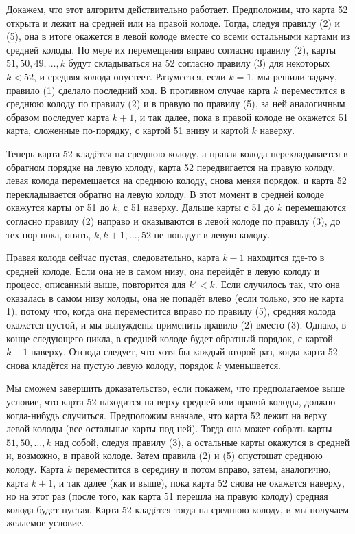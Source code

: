 Докажем, что этот алгоритм действительно работает.
Предположим, что карта 52 открыта и лежит на средней или на правой колоде.
Тогда, следуя правилу (2) и (5), она в итоге окажется в левой колоде вместе со всеми остальными картами из средней колоды.
По мере их перемещения вправо согласно правилу (2), карты $51, 50, 49, \dots, k$ будут складываться на 52 согласно правилу (3) для некоторых $k < 52$, и средняя колода опустеет.
Разумеется, если $k = 1$, мы решили задачу, правило (1) сделало последний ход.
В противном случае карта $k$ переместится в среднюю колоду по правилу (2) и в правую по правилу (5), за ней аналогичным образом последует карта $k+1$, и так далее, пока в правой колоде не окажется 51 карта, сложенные по-порядку, с картой 51 внизу и картой $k$ наверху.

Теперь карта 52 кладётся на среднюю колоду, а правая колода перекладывается в обратном порядке на левую колоду, карта 52 передвигается на правую колоду, левая колода перемещается на среднюю колоду, снова меняя порядок, и карта 52 перекладывается обратно на левую колоду.
В этот момент в средней колоде окажутся карты от 51 до $k$, с 51 наверху.
Дальше карты с 51 до $k$ перемещаются согласно правилу (2) направо и оказываются в левой колоде по правилу (3), до тех пор пока, опять, $k, k+1, \dots, 52$ не попадут в левую колоду.

Правая колода сейчас пустая, следовательно, карта $k-1$ находится где-то в средней колоде.
Если она не в самом низу, она перейдёт в левую колоду и процесс, описанный выше, повторится для $k' < k$.
Если случилось так, что она оказалась в самом низу колоды, она не попадёт влево (если только, это не карта 1), потому что, когда она переместится вправо по правилу (5), средняя колода окажется пустой, и мы вынуждены применить правило (2) вместо (3).
Однако, в конце следующего цикла, в средней колоде будет обратный порядок, с картой $k-1$ наверху.
Отсюда следует, что хотя бы каждый второй раз, когда карта 52 снова кладётся на пустую левую колоду, порядок $k$ уменьшается.

Мы сможем завершить доказательство, если покажем, что предполагаемое выше условие, что карта 52 находится на верху средней или правой колоды, должно когда-нибудь случиться.
Предположим вначале, что карта 52 лежит на верху левой колоды (все остальные карты под ней).
Тогда она может собрать карты $51, 50, \dots, k$ над собой, следуя правилу (3), а остальные карты окажутся в средней и, возможно, в правой колоде.
Затем правила (2) и (5) опустошат среднюю колоду.
Карта $k$ переместится в середину и потом вправо, затем, аналогично, карта $k+1$, и так далее (как и выше), пока карта 52 снова не окажется наверху, но на этот раз (после того, как карта 51 перешла на правую колоду) средняя колода будет пустая.
Карта 52 кладётся тогда на среднюю колоду, и мы получаем желаемое условие.

